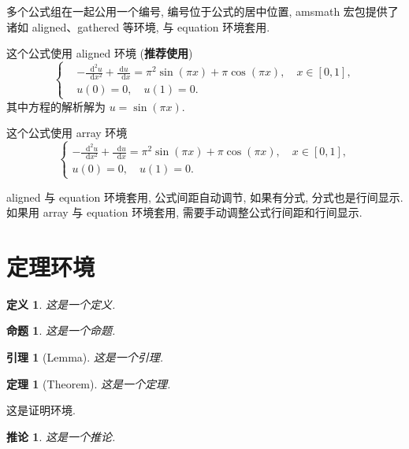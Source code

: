 \documentclass[openany,twoside,12pt]{book}
\makeatletter
\theoremstyle{plain}
\newtheorem{definition}{定义}[chapter]
\newtheorem{proposition}{命题}[chapter]
\newtheorem{lemma}{引理}[chapter]
\newtheorem{theorem}{定理}[chapter]
\newtheorem{corollary}{推论}[chapter]
\renewcommand{\proofname}{证明}
\renewenvironment{proof}[1][\proofname]{\par
  \pushQED{\qed}%
  \normalfont \topsep6\p@\@plus6\p@\relax
  \trivlist
  \item[\hskip\labelsep\bfseries
  #1\@addpunct{\,:\,}]\ignorespaces
}{%
  \popQED\endtrivlist\@endpefalse
}
\newcommand{\dif}{\mathop{}\!\mathrm{d}}
\makeatother
\begin{document}
多个公式组在一起公用一个编号, 编号位于公式的居中位置, amsmath 宏包提供了诸如 aligned、gathered 等环境, 与 equation 环境套用.

这个公式使用 aligned 环境 (\textbf{推荐使用})
\begin{equation}\label{eq:alignedEq}
\left\{\begin{aligned}
  &-\frac{{\dif}^{2} u}{\dif x^{2}}+\frac{\mathrm{d} u}{\dif x}=\pi^{2} \sin (\pi x)+\pi \cos (\pi x),\quad x \in [0,1], \\
  &u(0)=0,\quad u(1)=0.
\end{aligned} \right.
\end{equation}
其中方程的解析解为 $u=\sin(\pi x)$.

这个公式使用 array 环境
\begin{equation}\label{eq:arrayEq}
\left\{\begin{array}{l}
\displaystyle
-\frac{{\dif}^{2} u}{\dif x^{2}}+\frac{\dif u}{\dif x}=\pi^{2} \sin (\pi x)+\pi \cos (\pi x),\quad x \in [0,1], \\[6pt]
u(0)=0,\quad u(1)=0.
\end{array} \right.
\end{equation}

aligned 与 equation 环境套用, 公式间距自动调节, 如果有分式, 分式也是行间显示. 如果用 array 与 equation 环境套用, 需要手动调整公式行间距和行间显示.


\section{定理环境}

\begin{definition}\label{def:foo}
这是一个定义.
\end{definition}

\begin{proposition}\label{prop:foo}
这是一个命题.
\end{proposition}

\begin{lemma}[Lemma]\label{lmm:foo}
这是一个引理.
\end{lemma}

\begin{theorem}[Theorem]\label{thm:foo}
这是一个定理.
\end{theorem}
\begin{proof}
这是证明环境.
\end{proof}

\begin{corollary}\label{cor:foo}
这是一个推论.
\end{corollary}
\end{document}
